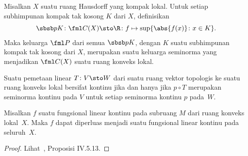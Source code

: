 \begin{exam}\label{X_LCS1} Misalkan $X$ suatu ruang Hausdorff yang kompak lokal. Untuk setiap subhimpunan kompak tak kosong $K$ dari $X$, definisikan
   \[ \sbsb pK\colon \fml C(X) \sto \R\colon f \mapsto \sup\{\abs{f(x)}\colon x \in K\}. \]
Maka keluarga $\fml P$ dari semua $\sbsb pK$, dengan $K$ suatu subhimpunan kompak tak kosong dari $X$, merupakan suatu keluarga seminorma
yang menjadikan $\fml C(X)$ suatu ruang konveks lokal.
\end{exam}

\begin{prop} Suatu pemetaan linear $T\colon V \sto W$ dari suatu ruang vektor topologis ke suatu ruang konveks lokal bersifat kontinu jika dan hanya jika
$p \circ T$ merupakan seminorma kontinu pada $V$ untuk setiap seminorma kontinu $p$ pada~$W$.
\end{prop}

\begin{prop} Misalkan $f$ suatu fungsional linear kontinu pada subruang $M$ dari ruang konveks lokal~$X$. Maka $f$ dapat diperluas menjadi suatu
fungsional linear kontinu pada seluruh~$X$.
\end{prop}



\begin{proof} Lihat~\cite{Conway:1990}, Proposisi IV.5.13.   \ns
\end{proof}



















